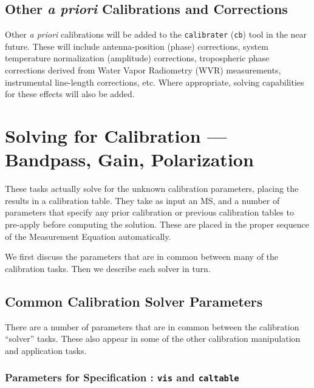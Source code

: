 \subsection{Other {\it a priori} Calibrations and Corrections}
\label{section:cal.prior.other}

Other {\it a priori} calibrations will be added to the 
{\tt calibrater} ({\tt cb}) tool 
in the near future.  These will include antenna-position (phase)
corrections, system temperature normalization (amplitude) corrections,
tropospheric phase corrections derived from Water Vapor Radiometry
(WVR) measurements, instrumental line-length corrections, etc.  Where
appropriate, solving capabilities for these effects will also be
added.

\section{Solving for Calibration --- Bandpass, Gain, Polarization}
\label{section:cal.solve}

These tasks actually solve for the unknown calibration parameters,
placing the results in a calibration table.  They take as input
an MS, and a number of parameters that specify any prior calibration
or previous calibration tables to pre-apply before computing the
solution.  These are placed in the proper sequence of the Measurement
Equation automatically.

We first discuss the parameters that are in common between many
of the calibration tasks.  Then we describe each solver in turn.

\subsection{Common Calibration Solver Parameters}
\label{section:cal.solve.pars}

There are a number of parameters that are in common between 
the calibration ``solver'' tasks.  These also appear in some
of the other calibration manipulation and application tasks.

\subsubsection{Parameters for Specification : {\tt vis} and
{\tt caltable} }
\label{section:cal.solve.pars.spec}

